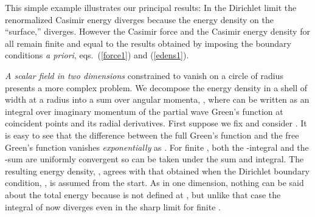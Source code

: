 \documentclass[a4paper,aps,amsfonts,prl,showpacs,nobibnotes,nofootinbib,%
tightenlines,twocolumn]{revtex4}
\providecommand{\vek}[1]{\mathbf{#1}}
\begin{document}
This simple example illustrates our principal results: In the
Dirichlet limit the renormalized Casimir energy diverges because the
energy density on the ``surface,'' \coordHE{} diverges.  However the
Casimir force and the Casimir energy density for all \coordHE{}
remain finite and equal to the results obtained by imposing the
boundary conditions {\it a priori\/}, eqs.~(\ref{force1}) and
(\ref{edens1}).

\emph{A scalar field in two dimensions} constrained to vanish on a circle of
radius \coordHE{} presents a more complex problem. We decompose the energy
density in a shell of width \coordHE{} at a radius \coordHE{} into a sum over angular
momenta, \coordHE{}, where \coordHE{} can
be written as an integral over imaginary momentum \coordHE{}
of the partial wave Green's function at coincident
points \coordHE{} and its radial derivatives.  First
suppose we fix \myHighlight{$\sigma(\vek x)=\delta(r-a)$}\coordHE{} and consider \coordHE{}.  It
is easy to see that the difference \coordHE{} 
between the full Green's function \coordHE{} and the free
Green's function \coordHE{} vanishes \emph{exponentially}
as \coordHE{}.  For finite \myHighlight{$\lambda$}\coordHE{}, both the \coordHE{}-integral and the
\myHighlight{$\ell$}\coordHE{}-sum are uniformly  convergent so \myHighlight{$\lambda\to\infty$}\coordHE{} can be
taken under the sum and integral.  The resulting energy density,
\coordHE{}, agrees with that obtained when the Dirichlet
boundary condition, \coordHE{}, is assumed from the start.  As in one
dimension, nothing can be said about the total energy because
\coordHE{} is not defined at \coordHE{}, but unlike that case  the
integral of \coordHE{} now diverges even in the sharp limit for
finite \myHighlight{$\lambda$}\coordHE{}.
\end{document}
